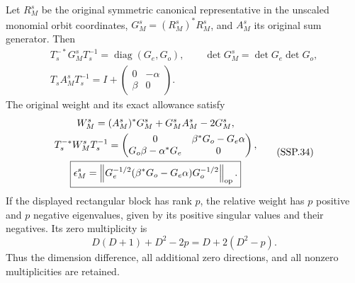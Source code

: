 \begin{theorem}
Let \(R_M^s\) be the original symmetric canonical representative
in the unscaled monomial orbit coordinates, \(G_M^s=(R_M^s)^*R_M^s\),
and \(A_M^s\) its original sum generator.
Then
\[
 \begin{gathered}
 T_s^{-*}G_M^sT_s^{-1}=\operatorname{diag}(G_e,G_o),\qquad
 \det G_M^s=\det G_e\det G_o,\\
 T_sA_M^sT_s^{-1}
      =I+\begin{pmatrix}0&-\alpha\\\beta&0\end{pmatrix}.
 \end{gathered}                                                    \tag{SSP.33}
\]
The original weight and its exact allowance satisfy
\[
 \begin{gathered}
 W_M^s=(A_M^s)^*G_M^s+G_M^sA_M^s-2G_M^s,\\
 T_s^{-*}W_M^sT_s^{-1}
   =\begin{pmatrix}
     0&\beta^*G_o-G_e\alpha\\
     G_o\beta-\alpha^*G_e&0
    \end{pmatrix},\\
 \boxed{\epsilon_M^s
   =\left\|G_e^{-1/2}(\beta^*G_o-G_e\alpha)G_o^{-1/2}\right\|_{\rm op}.}
 \end{gathered}                                                    \tag{SSP.34}
\]
If the displayed rectangular block has rank \(p\), the relative
weight has \(p\) positive and \(p\) negative eigenvalues,
given by its positive singular values and their negatives.
Its zero multiplicity is
\[
 D(D+1)+D^2-2p=D+2(D^2-p).
 \tag{SSP.35}
\]
Thus the dimension difference, all additional zero directions,
and all nonzero multiplicities are retained.
\end{theorem}
